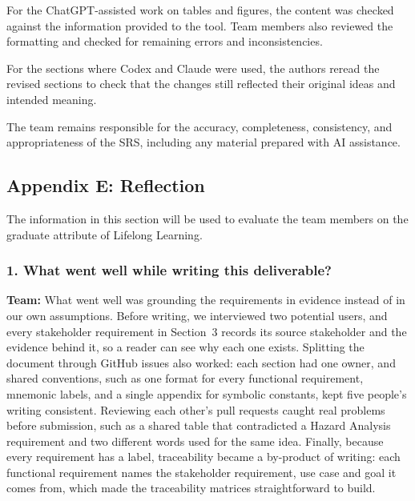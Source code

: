 \documentclass[12pt]{article}
\begin{document}
For the ChatGPT-assisted work on tables and figures, the content was checked against the information provided to the tool. Team members also reviewed the formatting and checked for remaining errors and inconsistencies.

For the sections where Codex and Claude were used, the authors reread the revised sections to check that the changes still reflected their original ideas and intended meaning.

The team remains responsible for the accuracy, completeness, consistency, and appropriateness of the SRS, including any material prepared with AI assistance.

\subsection{Appendix E: Reflection}


The information in this section will be used to evaluate the team members on the
graduate attribute of Lifelong Learning. 



% 

\subsubsection*{1. What went well while writing this deliverable?}

\textbf{Team:} What went well was grounding the requirements in evidence
instead of in our own assumptions. Before writing, we interviewed two
potential users, and every stakeholder requirement in Section~3 records its
source stakeholder and the evidence behind it, so a reader can see why each
one exists. Splitting the document through GitHub issues also worked: each
section had one owner, and shared conventions, such as one format for every
functional requirement, mnemonic labels, and a single appendix for symbolic
constants, kept five people's writing consistent. Reviewing each other's pull
requests caught real problems before submission, such as a shared table that
contradicted a Hazard Analysis requirement and two different words used for
the same idea. Finally, because every requirement has a label, traceability
became a by-product of writing: each functional requirement names the
stakeholder requirement, use case and goal it comes from, which made the
traceability matrices straightforward to build.
\end{document}
